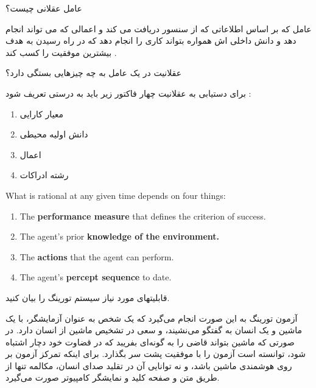 \documentclass[12pt]{article}
\begin{document}
\newpage
\vspace{20pt}
\noindent
عامل عقلانی چیست؟

\begin{tcolorbox}
\noindent
عامل که بر اساس اطلاعاتی که از سنسور دریافت می کند و اعمالی که می تواند انجام دهد و دانش داخلی اش همواره بتواند کاری را انجام دهد که در راه رسیدن به هدف بیشترین موفقیت را کسب کند .

\end{tcolorbox}


\vspace{20pt}
\noindent
عقلانیت در یک عامل به چه چیزهایی بستگی دارد؟




\begin{tcolorbox}
\noindent
برای دستیابی به عقلانیت چهار فاکتور زیر باید به درستی تعریف شود :

\begin{enumerate}
	\item معیار کارایی
	\item دانش اولیه محیطی
	\item اعمال
	\item رشته ادراکات
\end{enumerate}
\end{tcolorbox}


\begin{latin}
\begin{tcolorbox}
\noindent
What is rational at any given time depends on four things:

\begin{enumerate}
	\item The \textbf{performance measure} that defines the criterion of success.
	\item The agent’s prior \textbf{knowledge of the environment.}
	\item The \textbf{actions} that the agent can perform.
	\item The agent’s \textbf{percept sequence} to date.
\end{enumerate}
\end{tcolorbox}
\end{latin}




\newpage
\vspace{20pt}
\noindent
قابلیتهای مورد نیاز سیستم تورینگ را بیان کنید.



\begin{tcolorbox}
آزمون تورینگ به این صورت انجام می‌گیرد که یک شخص به عنوان آزمایشگر، با یک ماشین و یک انسان به گفتگو می‌نشیند، و سعی در تشخیص ماشین از انسان دارد. در صورتی که ماشین بتواند قاضی را به گونه‌ای بفریبد که در قضاوت خود دچار اشتباه شود، توانسته‌ است آزمون را با موفقیت پشت سر بگذارد. برای اینکه تمرکز آزمون بر روی هوشمندی ماشین باشد، و نه توانایی آن در تقلید صدای انسان، مکالمه تنها از طریق متن و صفحه کلید و نمایشگر کامپیوتر صورت می‌گیرد. 
\end{tcolorbox}
\end{document}
